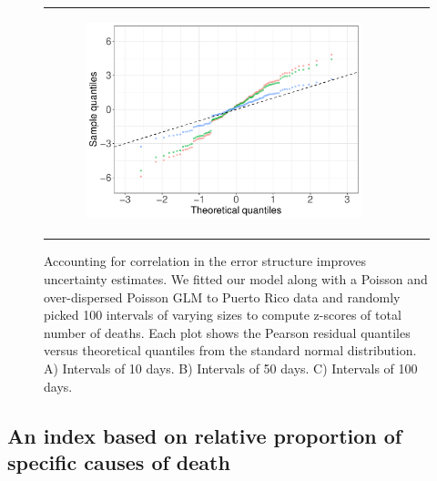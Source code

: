 \documentclass[11pt]{article}
\begin{document}
\begin{figure}[ht]
\begin{tabular}{lll}
\begin{subfigure}[t]{0.3\linewidth}
		\includegraphics[width=1\linewidth]{figs/figure-5c.pdf}
	\end{subfigure}\\
	\end{tabular}
	\caption{Accounting for correlation in the error structure improves uncertainty estimates. We fitted our model along with a Poisson and over-dispersed Poisson GLM to Puerto Rico data and randomly picked 100 intervals of varying sizes to compute z-scores of total number of deaths. Each plot shows the Pearson residual quantiles versus theoretical quantiles from the standard normal distribution. A) Intervals of 10 days. B) Intervals of 50 days. C) Intervals of 100 days.}
	\label{fig:deaths-qqplots}
\end{figure}

\subsection{An index based on relative proportion of specific causes of death}
\label{subsec:causes-deaths}
\end{document}
